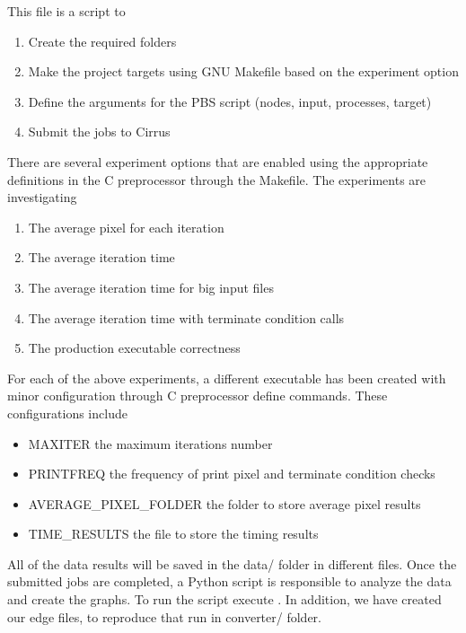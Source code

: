 \documentclass[12pt,a4paper]{article}
\begin{document}
	 This file is a script to
	\begin{enumerate}
    \item Create the required folders
    \item Make the project targets using GNU Makefile based on the experiment option
    \item Define the arguments for the PBS script (nodes, input, processes, target)
    \item Submit the jobs to Cirrus
	\end{enumerate}
	
  There are several experiment options that are enabled using the appropriate definitions in the C preprocessor through the Makefile. The experiments are investigating
  \begin{enumerate}
    \item The average pixel for each iteration
    \item The average iteration time
    \item The average iteration time for big input files
    \item The average iteration time with terminate condition calls
    \item The production executable correctness
  \end{enumerate}

	 For each of the above experiments, a different executable has been created with minor configuration through C preprocessor define commands. These configurations include 
	
	\begin{itemize}
		\item MAXITER the maximum iterations number
		\item PRINTFREQ the frequency of print pixel and terminate condition checks
		\item AVERAGE\_PIXEL\_FOLDER the folder to store average pixel results
		\item TIME\_RESULTS the file to store the timing results
	\end{itemize}

	All of the data results will be saved in the data/ folder in different files. Once the submitted jobs are completed, a Python script is responsible to analyze the data and create the graphs. To run the script execute . In addition, we have created our edge files, to reproduce that run  in converter/ folder.
	
\end{document}
